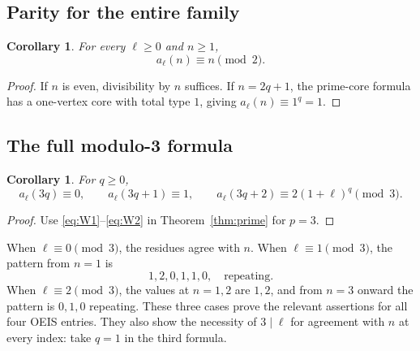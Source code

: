 \documentclass[11pt,letterpaper]{article}
\newtheorem{corollary}[theorem]{Corollary}
\theoremstyle{definition}
\theoremstyle{remark}
\begin{document}
\subsection{Parity for the entire family}
\begin{corollary}\label{cor:parity}
For every $\ell\ge0$ and $n\ge1$,
\[
 a_\ell(n)\equiv n\pmod2.
\]
\end{corollary}
\begin{proof}
If $n$ is even, divisibility by $n$ suffices. If $n=2q+1$, the
prime-core formula has a one-vertex core with total type $1$, giving
$a_\ell(n)\equiv1^q=1$.
\end{proof}

\subsection{The full modulo-3 formula}
\begin{corollary}\label{cor:mod3}
For $q\ge0$,
\begin{equation}\label{eq:mod3}
 a_\ell(3q)\equiv0,\qquad
 a_\ell(3q+1)\equiv1,\qquad
 a_\ell(3q+2)\equiv2(1+\ell)^q\pmod3.
\end{equation}
\end{corollary}
\begin{proof}
Use \eqref{eq:W1}--\eqref{eq:W2} in Theorem~\ref{thm:prime} for $p=3$.
\end{proof}

When $\ell\equiv0\pmod3$, the residues agree with $n$. When
$\ell\equiv1\pmod3$, the pattern from $n=1$ is
\[
 1,2,0,1,1,0,\quad\text{repeating}.
\]
When $\ell\equiv2\pmod3$, the values at $n=1,2$ are $1,2$, and from
$n=3$ onward the pattern is $0,1,0$ repeating. These three cases prove
the relevant assertions for all four OEIS entries. They also show the
necessity of $3\mid\ell$ for agreement with $n$ at every index: take
$q=1$ in the third formula.
\end{document}
